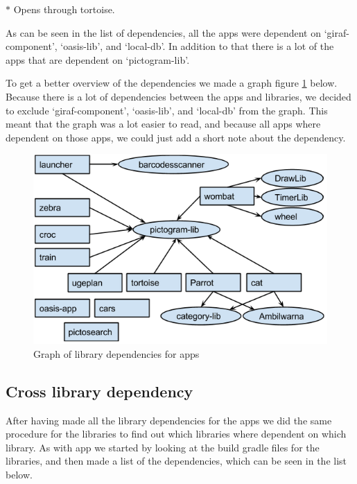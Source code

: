 $*$ Opens through tortoise.

As can be seen in the list of dependencies, all the apps were dependent on ‘giraf-component’, ‘oasis-lib’, and ‘local-db’. In addition to that there is a lot of the apps that are dependent on ‘pictogram-lib’.

To get a better overview of the dependencies we made a graph figure \ref{AppLibependencies} below. Because there is a lot of dependencies between the apps and libraries, we decided to exclude ‘giraf-component’, ‘oasis-lib’, and ‘local-db’ from the graph. This meant that the graph was a lot easier to read, and because all apps where dependent on those apps, we could just add a short note about the dependency.


\begin{figure}[H]
	\centering
	\includegraphics[width=0.8 \textwidth]{pictures/AppLibependencies.png}
	\caption{Graph of library dependencies for apps}
	\label{AppLibependencies}
\end{figure}

\subsection{Cross library dependency}
After having made all the library dependencies for the apps we did the same procedure for the libraries to find out which libraries where dependent on which library. As with app we started by looking at the build gradle files for the libraries, and then made a list of the dependencies, which can be seen in the list below.

